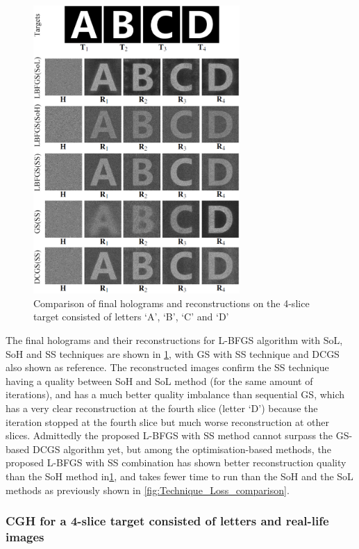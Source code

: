 \begin{figure}[H]
	\centering
	\includegraphics[width=0.7\textwidth]{final_holograms_reconstructions_4_slice}
	\caption{Comparison of final holograms and reconstructions on the 4-slice target consisted of letters `A', `B', `C' and `D'}
	\label{fig:3D_ABCD}
\end{figure}

The final holograms and their reconstructions for L-BFGS algorithm with SoL, SoH and SS techniques are shown in \cref{fig:3D_ABCD}, with GS with SS technique and DCGS also shown as reference. The reconstructed images confirm the SS technique having a quality between SoH and SoL method (for the same amount of iterations), and has a much better quality imbalance than sequential GS, which has a very clear reconstruction at the fourth slice (letter `D') because the iteration stopped at the fourth slice but much worse reconstruction at other slices. Admittedly the proposed L-BFGS with SS method cannot surpass the GS-based DCGS algorithm yet, but among the optimisation-based methods, the proposed L-BFGS with SS combination has shown better reconstruction quality than the SoH method in\cref{fig:3D_ABCD}, and takes fewer time to run than the SoH and the SoL methods as previously shown in \cref{fig:Technique_Loss_comparison}.



\subsubsection{CGH for a 4-slice target consisted of letters and real-life images}

